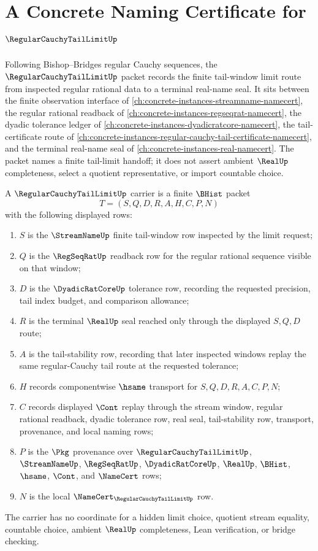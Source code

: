 \chapter{A Concrete Naming Certificate for $\RegularCauchyTailLimitUp$}
\label{ch:concrete-instances-regular-cauchy-tail-limit-namecert}

Following Bishop--Bridges regular Cauchy sequences, the $\RegularCauchyTailLimitUp$ packet records the finite tail-window limit route from inspected regular rational data to a terminal real-name seal. It sits between the finite observation interface of \autoref{ch:concrete-instances-streamname-namecert}, the regular rational readback of \autoref{ch:concrete-instances-regseqrat-namecert}, the dyadic tolerance ledger of \autoref{ch:concrete-instances-dyadicratcore-namecert}, the tail-certificate route of \autoref{ch:concrete-instances-regular-cauchy-tail-certificate-namecert}, and the terminal real-name seal of \autoref{ch:concrete-instances-real-namecert}. The packet names a finite tail-limit handoff; it does not assert ambient $\RealUp$ completeness, select a quotient representative, or import countable choice.

\begin{definition}
\label{def:regular-cauchy-tail-limit-carrier}
A $\RegularCauchyTailLimitUp$ carrier is a finite $\BHist$ packet
$$
T=(S,Q,D,R,A,H,C,P,N)
$$
with the following displayed rows:
\begin{enumerate}
\item $S$ is the $\StreamNameUp$ finite tail-window row inspected by the limit request;
\item $Q$ is the $\RegSeqRatUp$ readback row for the regular rational sequence visible on that window;
\item $D$ is the $\DyadicRatCoreUp$ tolerance row, recording the requested precision, tail index budget, and comparison allowance;
\item $R$ is the terminal $\RealUp$ seal reached only through the displayed $S,Q,D$ route;
\item $A$ is the tail-stability row, recording that later inspected windows replay the same regular-Cauchy tail route at the requested tolerance;
\item $H$ records componentwise $\hsame$ transport for $S,Q,D,R,A,C,P,N$;
\item $C$ records displayed $\Cont$ replay through the stream window, regular rational readback, dyadic tolerance row, real seal, tail-stability row, transport, provenance, and local naming rows;
\item $P$ is the $\Pkg$ provenance over $\RegularCauchyTailLimitUp$, $\StreamNameUp$, $\RegSeqRatUp$, $\DyadicRatCoreUp$, $\RealUp$, $\BHist$, $\hsame$, $\Cont$, and $\NameCert$ rows;
\item $N$ is the local $\NameCert_{\RegularCauchyTailLimitUp}$ row.
\end{enumerate}
The carrier has no coordinate for a hidden limit choice, quotient stream equality, countable choice, ambient $\RealUp$ completeness, Lean verification, or bridge checking.
\end{definition}

